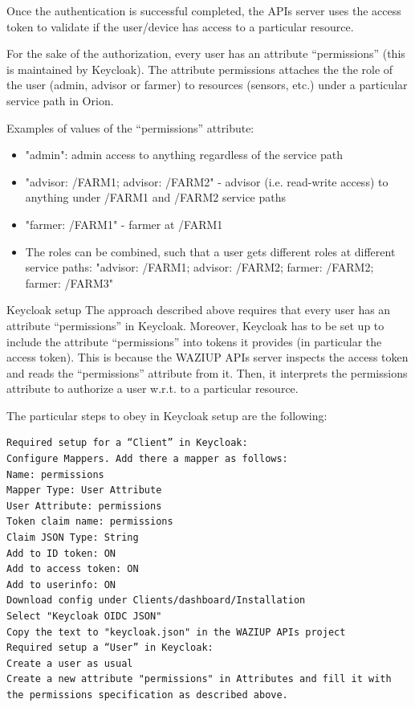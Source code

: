 Once the authentication is successful completed, the APIs server uses the access token to validate if the user/device has access to a particular resource.

For the sake of the authorization, every user has an attribute “permissions” (this is maintained by Keycloak). The attribute permissions attaches the the role of the user (admin, advisor or farmer) to resources (sensors, etc.) under a particular service path in Orion. 

Examples of values of the “permissions” attribute:
\begin{itemize}

\item "admin": admin access to anything regardless of the service path
\item "advisor: /FARM1; advisor: /FARM2" - advisor (i.e. read-write access) to anything under /FARM1 and /FARM2 service paths
\item "farmer: /FARM1" - farmer at /FARM1
\item The roles can be combined, such that a user gets different roles at different service paths: "advisor: /FARM1; advisor: /FARM2; farmer: /FARM2; farmer: /FARM3" 

\end{itemize}

Keycloak setup
The approach described above requires that every user has an attribute “permissions” in Keycloak. Moreover, Keycloak has to be set up to include the attribute “permissions” into tokens it provides (in particular the access token). This is because the WAZIUP APIs server inspects the access token and reads the “permissions” attribute from it. Then, it interprets the permissions attribute to authorize a user w.r.t. to a particular resource.

The particular steps to obey in Keycloak setup are the following:
\begin{verbatim}
Required setup for a “Client” in Keycloak:
Configure Mappers. Add there a mapper as follows:
Name: permissions
Mapper Type: User Attribute
User Attribute: permissions
Token claim name: permissions
Claim JSON Type: String
Add to ID token: ON
Add to access token: ON
Add to userinfo: ON
Download config under Clients/dashboard/Installation
Select "Keycloak OIDC JSON"
Copy the text to "keycloak.json" in the WAZIUP APIs project
Required setup a “User” in Keycloak:
Create a user as usual
Create a new attribute "permissions" in Attributes and fill it with the permissions specification as described above.
\end{verbatim}

